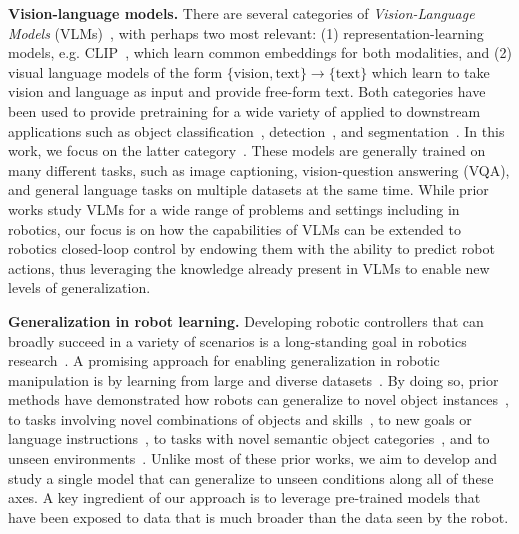 \textbf{Vision-language models.}
There are several categories of \emph{Vision-Language Models} (VLMs)~\citep{gan2022vision}, with perhaps two most relevant: (1) representation-learning models, e.g. CLIP~\citep{radford2021learning}, which learn common embeddings for both modalities, and (2) visual language models of the form $\{\text{vision},\text{text}\} \rightarrow \{\text{text}\}$ which learn to take vision and language as input and provide free-form text. 
Both categories have been used to provide pretraining for a wide variety of applied to downstream applications such as object classification~\citep{radford2021learning}, detection~\citep{gu2021open}, and segmentation~\citep{ghiasi2021open}.
In this work, we focus on the latter category~\citep{alayrac2022flamingo, chen2023pali, chen2023palix, driess2023palm, li2019visualbert, lu2019vilbert, hao2022language, li2023blip}. 
These models are generally trained on many different tasks, such as image captioning, vision-question answering (VQA), and general language tasks on multiple datasets at the same time.
While prior works study VLMs for a wide range of problems and settings including in robotics, our focus is on how the capabilities of VLMs 
can be extended to robotics closed-loop control by endowing them with the ability to predict robot actions, thus leveraging the knowledge already present in VLMs to enable new levels of generalization.

\textbf{Generalization in robot learning.} Developing robotic controllers that can broadly succeed in a variety of scenarios is a long-standing goal in robotics research~\citep{smith1973design,kaelbling2020foundation}. A promising approach for enabling generalization in robotic manipulation is by learning from large and diverse datasets~\citep{pinto2016supersizing,levine2018learning,dasari2019robonet}. By doing so, prior methods have demonstrated how robots can generalize to novel object instances~\citep{pinto2016supersizing,mahler2017dex,levine2018learning,finn2017deep,young2021visual}, to tasks involving novel combinations of objects and skills~\citep{finn2017one,yu2018one,james2018task,dasari2021transformers,jang2022bc}, to new goals or language instructions~\citep{pong2019skew,nair2022learning,jang2022bc,jiang2022vima,mees2022matters,liu2022instruction}, to tasks with novel semantic object categories~\citep{shridhar2021cliport,stone2023open}, and to unseen environments~\citep{hansen2020self,cui2022play,du2023behavior}. Unlike most of these prior works, we aim to develop and study a single model that can generalize to unseen conditions along all of these axes. A key ingredient of our approach is to leverage pre-trained models that have been exposed to data that is much broader than the data seen by the robot.

